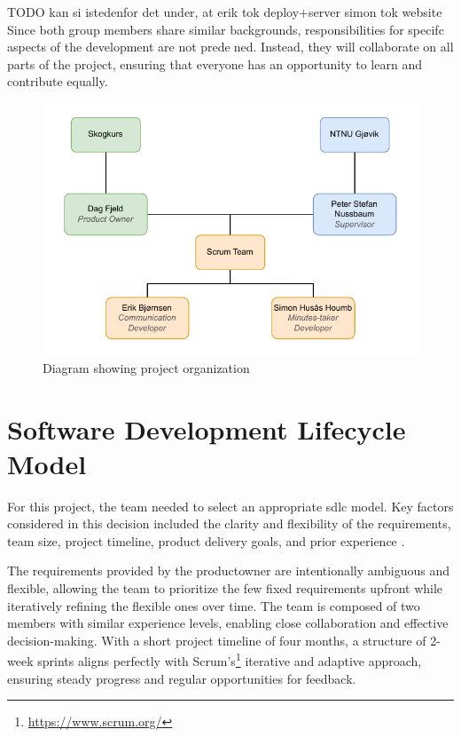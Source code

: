 TODO kan si istedenfor det under, at erik tok deploy+server simon tok website
Since both group members share similar backgrounds, responsibilities for specifc aspects of the
development are not predened. Instead, they will collaborate on all parts of the project, ensuring
that everyone has an opportunity to learn and contribute equally.

\begin{figure}[h]
    \centering
        \includegraphics[width=1.0\linewidth]{figures/project_organization.pdf}
    \caption{Diagram showing project organization}
    \label{fig:projectorganization}
\end{figure}

\section{Software Development Lifecycle Model}

For this project, the team needed to select an appropriate \acrfull{sdlc} model. Key factors considered in this decision included the clarity and flexibility of the requirements, team size, project timeline, product delivery goals, and prior experience \cite{sdlc_model}. 

The requirements provided by the \gls{productowner} are intentionally ambiguous and flexible, allowing the team to prioritize the few fixed requirements upfront while iteratively refining the flexible ones over time. The team is composed of two members with similar experience levels, enabling close collaboration and effective decision-making. With a short project timeline of four months, a structure of 2-week sprints aligns perfectly with Scrum's\footnote{\url{https://www.scrum.org/}} iterative and adaptive approach, ensuring steady progress and regular opportunities for feedback. 

